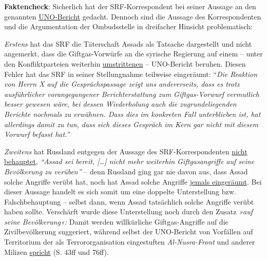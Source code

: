 \textbf{Faktencheck}: Sicherlich hat der SRF-Korrespondent bei seiner
Aussage an den genannten
\href{http://daccess-ods.un.org/access.nsf/GetFile?OpenAgent\&DS=S/2016/738\&Lang=E\&Type=PDF}{UNO-Bericht}
gedacht. Dennoch sind die Aussage des Korrespondenten und die
Argumentation der Ombudsstelle in dreifacher Hinsicht problematisch:

\emph{Erstens} hat das SRF die Täterschaft Assads als Tatsache
dargestellt und nicht angemerkt, dass die Giftgas-Vorwürfe an die
syrische Regierung auf einem -- unter den Konfliktparteien weiterhin
\href{http://www.reuters.com/article/us-mideast-crisis-syria-chemicalweapons-idUSKCN1152M8}{umstrittenen}
-- UNO-Bericht beruhen. Diesen Fehler hat das SRF in seiner
Stellungnahme teilweise eingeräumt: ``\emph{Die Reaktion von Herrn X auf
die Gesprächspassage zeigt uns andererseits, dass es trotz ausführlicher
vorangegangener Berichterstattung zum Giftgas-Vorwurf vermutlich besser
gewesen wäre, bei dessen Wiederholung auch die zugrundeliegenden
Berichte nochmals zu erwähnen. Dass dies im konkreten Fall unterblieben
ist, hat allerdings damit zu tun, dass sich dieses Gespräch im Kern gar
nicht mit diesem Vorwurf befasst hat.''}

\emph{Zweitens} hat Russland entgegen der Aussage des
SRF-Korrespondenten
\href{http://www.reuters.com/article/us-mideast-crisis-syria-chemicalweapons-idUSKCN1152M8}{nicht
behauptet}, \emph{``Assad sei bereit, {[}\ldots{}{]} nicht mehr
weiterhin Giftgasangriffe auf seine Bevölkerung zu verüben''} -- denn
Russland ging gar nie davon aus, dass Assad solche Angriffe verübt hat,
noch hat Assad solche Angriffe
\href{http://www.presstv.ir/Detail/2016/09/01/482705/Syria-UN-report-chemicals}{jemals
eingeräumt}. Bei dieser Aussage handelt es sich somit um eine doppelte
Unterstellung bzw. Falschbehauptung -- selbst dann, wenn Assad
tatsächlich solche Angriffe verübt haben sollte. Verschärft wurde diese
Unterstellung noch durch den Zusatz \emph{»auf seine Bevölkerung«:}
Damit werden willkürliche Giftgas-Angriffe auf die Zivilbevölkerung
suggeriert, während selbst der UNO-Bericht von Vorfällen auf Territorium
der als Terrororganisation eingestuften \emph{Al-Nusra-Front} und
anderer Milizen
\href{http://daccess-ods.un.org/access.nsf/GetFile?OpenAgent\&DS=S/2016/738\&Lang=E\&Type=PDF}{spricht}
(S. 43ff und 76ff).

